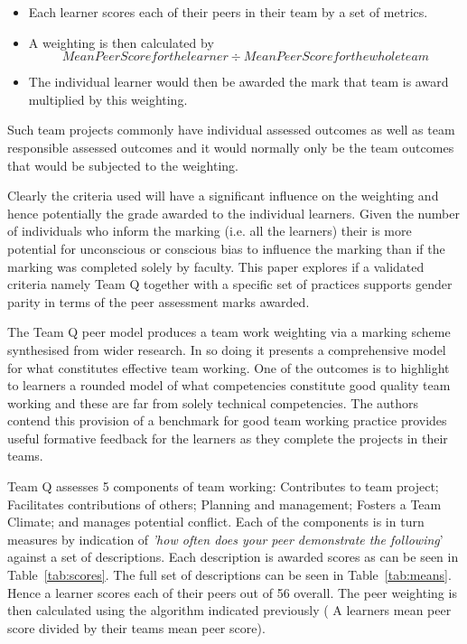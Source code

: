 \documentclass[sigconf, anonymous=true]{acmart}
\begin{document}
\begin{itemize}
\item Each learner scores each of their peers in their team by a set of metrics. 
\item A weighting is then calculated by \[ Mean Peer Score for the learner \div Mean Peer Score for the whole team\]
\item The individual learner would then be awarded the mark that team is award multiplied by this weighting.
\end{itemize}

Such team projects commonly have individual assessed outcomes as well as team responsible assessed outcomes and it would normally only be the team outcomes that would be subjected to the weighting.

Clearly the criteria used will have a significant influence on the weighting and hence potentially the grade awarded to the individual learners.  Given the number of individuals who inform the marking (i.e. all the learners) their is more potential for unconscious or conscious bias to influence the marking than if the marking was completed solely by faculty. This paper explores if a validated   criteria namely Team Q \cite{Britton2017} together with a specific set of practices supports gender parity in terms of the peer assessment marks awarded. 
  
The Team Q peer model produces a team work weighting via a marking scheme synthesised from wider research. In so doing it presents a comprehensive model for what constitutes effective team working. One of the outcomes is to highlight to learners a rounded model of what competencies constitute good quality team working and these are far from solely technical competencies. The authors contend this provision of a benchmark for good team working practice provides useful formative feedback for the learners as they complete the projects in their teams.

Team Q \cite{Britton2017} assesses 5 components of team working: Contributes to team project; Facilitates contributions of others; Planning and management; Fosters a Team Climate; and manages potential conflict. Each of the components is in turn measures by indication of \textit{'how often does your peer demonstrate the following}' against a set of descriptions. Each description is awarded scores as can be seen in Table~\ref{tab:scores}. The full set of descriptions can be seen in Table~\ref{tab:means}.  Hence a learner scores each of their peers out of 56 overall. The peer weighting is then calculated using the algorithm indicated previously ( A learners mean peer score divided by their teams mean peer score).
\end{document}
